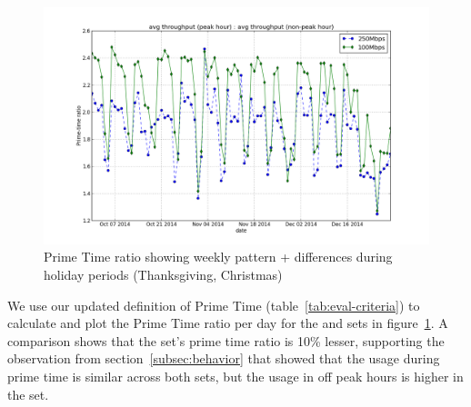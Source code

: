 \begin{figure}[ht]
\begin{minipage}{\linewidth}
\centering
\includegraphics[width=\linewidth]{figures/prime-time-ratio-by-date[replace].png}
\caption{Prime Time ratio showing weekly pattern + differences during holiday periods (Thanksgiving, Christmas)}
\label{fig:TS-prime-time-ratio}
\end{minipage}
\end{figure}

We use our updated definition of Prime Time (table~\ref{tab:eval-criteria}) to calculate and plot
the Prime Time ratio per day for the \test and \control sets in
figure~\ref{fig:TS-prime-time-ratio}. A comparison shows that
the \test set's prime time ratio is 10\% lesser, supporting the observation from
section~\ref{subsec:behavior} that showed that the usage during prime time is similar
across both sets, but the usage in off peak hours is higher in the \test set.